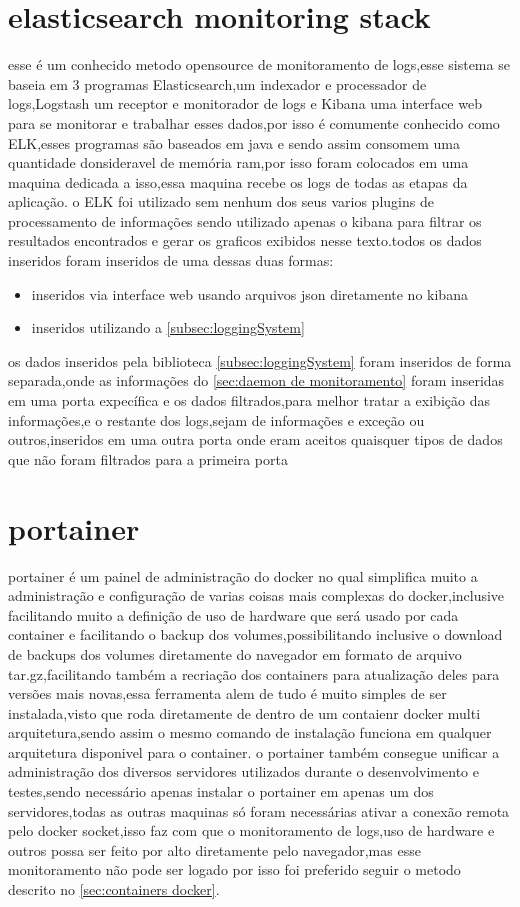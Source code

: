 \documentclass[
	12pt,				%
	openright,			%
	oneside,			%
	a4paper,			%
	english,			%
	french,				%
	spanish,			%
	brazil,				%
	]{abntex2}
\begin{document}
\section{elasticsearch monitoring stack}
\label{sec:elasticsearch monitoring stack}
esse é um conhecido metodo opensource de monitoramento de logs,esse sistema se baseia em 3 programas Elasticsearch,um indexador e processador de logs,Logstash um receptor e monitorador de logs e Kibana uma interface web para se monitorar e trabalhar esses dados,por isso é comumente conhecido como ELK,esses programas são baseados em java e sendo assim consomem uma quantidade donsideravel de memória ram,por isso foram colocados em uma maquina dedicada a isso,essa maquina recebe os logs de todas as etapas da aplicação.
o ELK foi utilizado sem nenhum dos seus varios plugins de processamento de informações sendo utilizado apenas o kibana para filtrar os resultados encontrados e gerar os graficos exibidos nesse texto.todos os dados inseridos foram inseridos de uma dessas duas formas:
\begin{itemize}
 \item inseridos via interface web usando arquivos json diretamente no kibana
 \item inseridos utilizando a \autoref{subsec:loggingSystem}
\end{itemize}
os dados inseridos pela biblioteca \autoref{subsec:loggingSystem} foram inseridos de forma separada,onde as informações do \autoref{sec:daemon de monitoramento} foram inseridas em uma porta expecífica e os dados filtrados,para melhor tratar a exibição das informações,e o restante dos logs,sejam de informações e exceção ou outros,inseridos em uma outra porta onde eram aceitos quaisquer tipos de dados que não foram filtrados para a primeira porta



\section{portainer}
\label{sec:portainer}
portainer é um painel de administração do docker no qual simplifica muito a administração e configuração de varias coisas mais complexas do docker,inclusive facilitando muito a definição de uso de hardware que será usado por cada container e facilitando o backup dos volumes,possibilitando inclusive o download de backups dos volumes diretamente do navegador em formato de arquivo tar.gz,facilitando também a recriação dos containers para atualização deles para versões mais novas,essa ferramenta alem de tudo é muito simples de ser instalada,visto que roda diretamente de dentro de um contaienr docker multi arquitetura,sendo assim o mesmo comando de instalação funciona em qualquer arquitetura disponivel para o container.
o portainer também consegue unificar a administração dos diversos servidores utilizados durante o desenvolvimento e testes,sendo necessário apenas instalar o portainer em apenas um dos servidores,todas as outras maquinas só foram necessárias ativar a conexão remota pelo docker socket,isso faz com que o monitoramento de logs,uso de hardware e outros possa ser feito por alto diretamente pelo navegador,mas esse monitoramento não pode ser logado por isso foi preferido seguir o metodo descrito no \autoref{sec:containers docker}.
\end{document}
